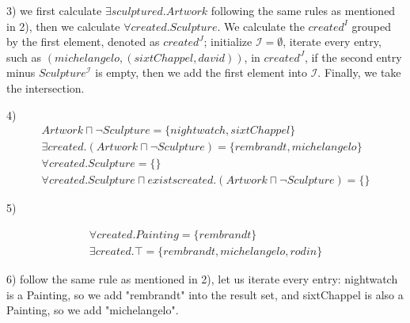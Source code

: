 \documentclass[11pt]{article}
\begin{document}
3) we first calculate $\exists sculptured.Artwork$ following the same rules as mentioned in 2), then we calculate $\forall created.Sculpture$. We calculate the $created^I$ grouped by the first element, denoted as $created^J$; initialize $\mathcal{I} = \emptyset $, iterate every entry, such as $(michelangelo, (sixtChappel, david))$, in $created^J$, if the second entry minus $Sculpture^\mathcal{I}$ is empty, then we add the first element into $\mathcal{I}$. Finally, we take the intersection.

4) 
\begin{align}
    Artwork \sqcap \neg Sculpture  = \{ nightwatch, sixtChappel \} \\
    \exists created.(Artwork \sqcap \neg Sculpture)  = \{ rembrandt, michelangelo \}\\
    \forall created.Sculpture  = \{ \}\\
    \forall created.Sculpture \sqcap exists created.(Artwork \sqcap \neg Sculpture)  = \{ \}
\end{align}

5) 

\begin{align}
    \forall created.Painting  = \{ rembrandt\}\\
    \exists created.\top = \{ rembrandt, michelangelo, rodin\} 
\end{align}

6) follow the same rule as mentioned in 2), let us iterate every entry: nightwatch is a Painting, so we add "rembrandt" into the result set, and sixtChappel is also a Painting, so we add "michelangelo".
\end{document}
